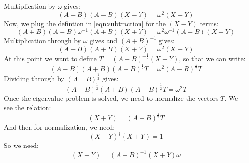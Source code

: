 \documentclass[12pt]{caltech_thesis}
\begin{document}
Multiplication by $\omega$ gives:
\begin{equation}
    (A+B)(A-B)(X-Y) = \omega^2 (X-Y)
\end{equation}
Now, we plug the defintion in \ref{eqn:subtraction} for the $(X-Y)$ terms:
\begin{equation}
    (A+B)(A-B)\omega^{-1}(A+B)(X+Y) = \omega^2 \omega^{-1}(A+B)(X+Y)
\end{equation}
Multiplication through by $\omega$ gives and $(A+B)^{-1}$ gives:
\begin{equation}
    (A-B)(A+B)(X+Y) = \omega^{2} (X+Y)
\end{equation}
At this point we want to define $T=(A-B)^{-\frac{1}{2}}(X+Y)$, so that we can write:
\begin{equation}
    (A-B)(A+B)(A-B)^{\frac{1}{2}}T = \omega^{2} (A-B)^{\frac{1}{2}}T
\end{equation}
Dividing through by $(A-B)^{\frac{1}{2}}$ gives:
\begin{equation}
    (A-B)^{\frac{1}{2}}(A+B)(A-B)^{\frac{1}{2}}T = \omega^{2} T
\end{equation}
Once the eigenvalue problem is solved, we need to normalize the vectors $T$. We see the relation:
\begin{equation}
    (X+Y) = (A-B)^{\frac{1}{2}}T
\end{equation}
And then for normalization, we need:
\begin{equation}
    (X-Y)^{\dag}(X+Y)=1
\end{equation}
So we need:
\begin{equation}
    (X-Y)=(A-B)^{-1}(X+Y)\omega 
\end{equation}
\end{document}
